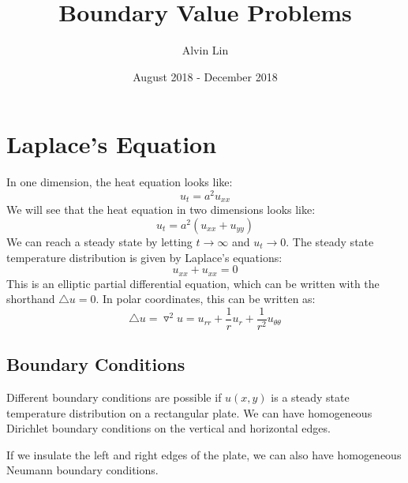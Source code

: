 \documentclass{math}
\title{Boundary Value Problems}
\author{Alvin Lin}
\date{August 2018 - December 2018}
\begin{document}
\maketitle

\section*{Laplace's Equation}
In one dimension, the heat equation looks like:
\[ u_t = a^2u_{xx} \]
We will see that the heat equation in two dimensions looks like:
\[ u_t = a^2(u_{xx}+u_{yy}) \]
We can reach a steady state by letting \( t\to\infty \) and \( u_t\to0 \).
The steady state temperature distribution is given by Laplace's equations:
\[ u_{xx}+u_{xx} = 0 \]
This is an elliptic partial differential equation, which can be written with
the shorthand \( \triangle u = 0 \). In polar coordinates, this can be written
as:
\[ \triangle u = \triangledown^2 u =
  u_{rr}+\frac{1}{r}u_r+\frac{1}{r^2}u_{\theta\theta} \]

\subsection*{Boundary Conditions}
Different boundary conditions are possible if \( u(x,y) \) is a steady state
temperature distribution on a rectangular plate. We can have homogeneous
Dirichlet boundary conditions on the vertical and horizontal edges.
\begin{center}
\end{center}
If we insulate the left and right edges of the plate, we can also have
homogeneous Neumann boundary conditions.
\begin{center}
\end{center}
\end{document}
